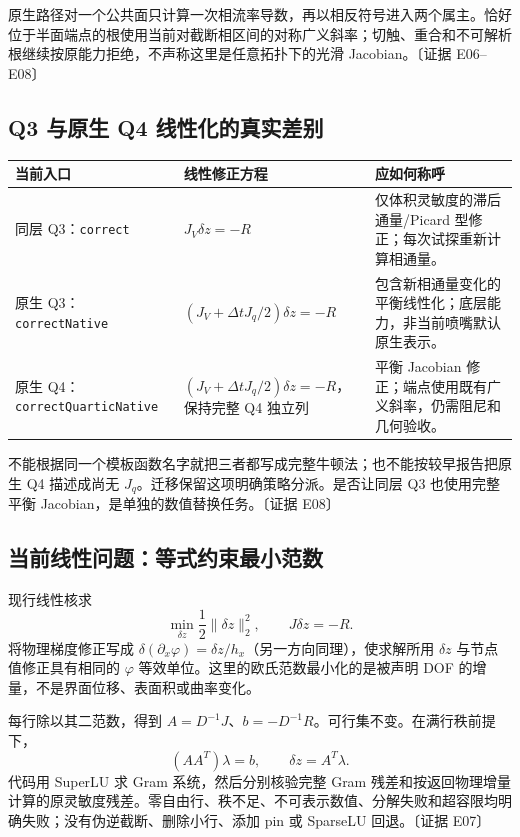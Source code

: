 \documentclass[UTF8,a4paper,11pt,fontset=fandol]{ctexart}
\newcommand{\code}[1]{\nolinkurl{#1}}
\newcommand{\ev}[1]{{\small\color{muted}〔证据 #1〕}}
\newcommand{\ph}{\varphi}\newcommand{\dt}{\Delta t}
\begin{document}
原生路径对一个公共面只计算一次相流率导数，再以相反符号进入两个属主。恰好位于半面端点的根使用当前对截断相区间的对称广义斜率；切触、重合和不可解析根继续按原能力拒绝，不声称这里是任意拓扑下的光滑 Jacobian。\ev{E06--E08}

\subsection{Q3 与原生 Q4 线性化的真实差别}
\begin{longtable}{@{}P{.27\textwidth}P{.30\textwidth}P{.37\textwidth}@{}}
\toprule 当前入口 & 线性修正方程 & 应如何称呼\\\midrule\endhead
同层 Q3：\code{correct} & $J_V\delta z=-R$ & 仅体积灵敏度的滞后通量/Picard 型修正；每次试探重新计算相通量。\\
原生 Q3：\code{correctNative} & $(J_V+\dt J_q/2)\delta z=-R$ & 包含新相通量变化的平衡线性化；底层能力，非当前喷嘴默认原生表示。\\
原生 Q4：\code{correctQuarticNative} & $(J_V+\dt J_q/2)\delta z=-R$，保持完整 Q4 独立列 & 平衡 Jacobian 修正；端点使用既有广义斜率，仍需阻尼和几何验收。\\
\bottomrule
\end{longtable}
不能根据同一个模板函数名字就把三者都写成完整牛顿法；也不能按较早报告把原生 Q4 描述成尚无 $J_q$。迁移保留这项明确策略分派。是否让同层 Q3 也使用完整平衡 Jacobian，是单独的数值替换任务。\ev{E08}

\subsection{当前线性问题：等式约束最小范数}
现行线性核求
\begin{equation}
 \min_{\delta z}\frac12\|\delta z\|_2^2,
 \qquad J\delta z=-R.
 \label{eq:minnorm}
\end{equation}
将物理梯度修正写成 $\delta(\partial_x\ph)=\delta z/h_x$（另一方向同理），使求解所用 $\delta z$ 与节点值修正具有相同的 $\ph$ 等效单位。这里的欧氏范数最小化的是被声明 DOF 的增量，不是界面位移、表面积或曲率变化。

每行除以其二范数，得到 $A=D^{-1}J$、$b=-D^{-1}R$。可行集不变。在满行秩前提下，
\begin{equation}
 (AA^T)\lambda=b,\qquad \delta z=A^T\lambda.
 \label{eq:gram}
\end{equation}
代码用 SuperLU 求 Gram 系统，然后分别核验完整 Gram 残差和按返回物理增量计算的原灵敏度残差。零自由行、秩不足、不可表示数值、分解失败和超容限均明确失败；没有伪逆截断、删除小行、添加 pin 或 SparseLU 回退。\ev{E07}
\end{document}
